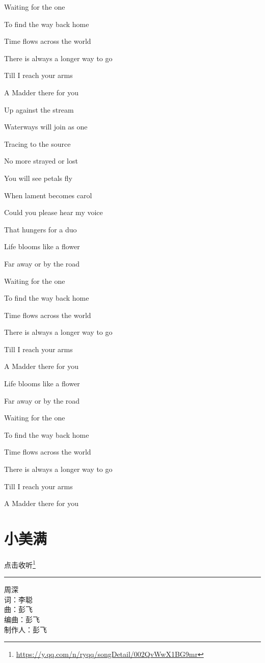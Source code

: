 \documentclass[]{ctexbook}
\renewcommand{\href}[2]{#2\footnote{\url{#1}}}
\begin{document}
Waiting for the one

To find the way back home

Time flows across the world

There is always a longer way to go

Till I reach your arms

A Madder there for you

Up against the stream

Waterways will join as one

Tracing to the source

No more strayed or lost

You will see petals fly

When lament becomes carol

Could you please hear my voice

That hungers for a duo

Life blooms like a flower

Far away or by the road

Waiting for the one

To find the way back home

Time flows across the world

There is always a longer way to go

Till I reach your arms

A Madder there for you

Life blooms like a flower

Far away or by the road

Waiting for the one

To find the way back home

Time flows across the world

There is always a longer way to go

Till I reach your arms

A Madder there for you

\section*{小美满}\label{happy-ending}


\href{https://y.qq.com/n/ryqq/songDetail/002QvWwX1BG9mr}{点击收听}

\begin{center}\rule{0.5\linewidth}{0.5pt}\end{center}

周深\\
词：李聪\\
曲：彭飞\\
编曲：彭飞\\
制作人：彭飞
\end{document}
